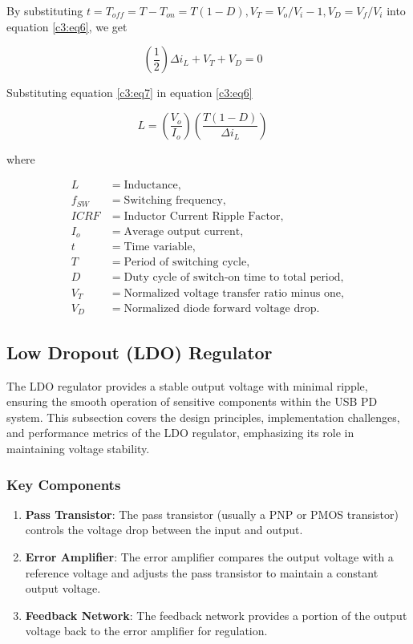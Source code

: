 By substituting \( t = T_{off} = T - T_{on} = T(1 - D), V_T = V_o/V_i - 1, V_D = V_f/V_i \) into equation \ref{c3:eq6}, we get

\begin{equation}
    \label{c3:eq7}
     \left(\frac{1}{2}\right)\Delta i_L + V_T + V_D = 0 \quad 
\end{equation}



Substituting equation \ref{c3:eq7} in equation \ref{c3:eq6}

\begin{equation}
\label{c3:eq8}
    L = \left(\frac{V_o}{I_o}\right)\left(\frac{T(1-D)}{\Delta i_L}\right)   \quad 
\end{equation}


where

\[
\begin{aligned}
L &= \text{Inductance}, \\
f_{SW} &= \text{Switching frequency}, \\
ICRF &= \text{Inductor Current Ripple Factor}, \\
I_o &= \text{Average output current}, \\
t &= \text{Time variable}, \\
T &= \text{Period of switching cycle}, \\
D &= \text{Duty cycle of switch-on time to total period}, \\
V_T &= \text{Normalized voltage transfer ratio minus one}, \\
V_D &= \text{Normalized diode forward voltage drop}.
\end{aligned}
\]


\subsection{Low Dropout (LDO) Regulator}
The LDO regulator provides a stable output voltage with minimal ripple, ensuring the smooth operation of sensitive components within the USB PD system\cite{robertson2010thermal}\cite{lee1999ldo}. This subsection covers the design principles, implementation challenges, and performance metrics of the LDO regulator, emphasizing its role in maintaining voltage stability.
\subsubsection{Key Components}

\begin{enumerate}
    \item \textbf{Pass Transistor}: The pass transistor (usually a PNP or PMOS transistor) controls the voltage drop between the input and output\cite{ti_ldo_theory}.
    \item \textbf{Error Amplifier}: The error amplifier compares the output voltage with a reference voltage and adjusts the pass transistor to maintain a constant output voltage\cite{ti_linear_regulators}.
    \item \textbf{Feedback Network}: The feedback network provides a portion of the output voltage back to the error amplifier for regulation\cite{infineon_usb_ccg2}.
\end{enumerate}

